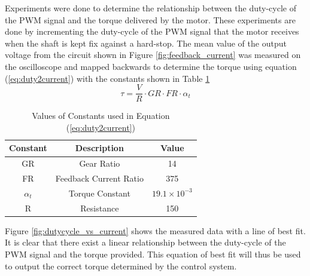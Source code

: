 Experiments were done to determine the relationship between the duty-cycle of the PWM signal and the torque delivered by the motor. These experiments are done by incrementing the duty-cycle of the PWM signal that the motor receives when the shaft is kept fix against a hard-stop. The mean value of the output voltage from the circuit shown in Figure \ref{fig:feedback_current} was measured on the oscilloscope and mapped backwards to determine the torque using equation (\ref{eq:duty2current}) with the constants shown in Table \ref{table:duty2current_constants}
\begin{equation} \label{eq:duty2current}
\tau = \frac{V}{R}\cdot GR \cdot FR \cdot \alpha_{t}
\end{equation}

\begin{table}[]
	\centering
	\begin{tabular}{|c|c|c|}
		\hline
		Constant & Description & Value \\
		\hline
		\hline
		GR &  Gear Ratio & 14 \\
		\hline
		FR & Feedback Current Ratio & 375 \\
		\hline
		$\alpha_{t}$ & Torque Constant & $19.1\times 10^{-3}$ \\
		\hline
		R & Resistance & 150 \\
		\hline
	\end{tabular}
	\caption{Values of Constants used in Equation (\ref{eq:duty2current})}
	\label{table:duty2current_constants}
\end{table}

 Figure \ref{fig:dutycycle_vs_current} shows the measured data with a line of best fit. It is clear that there exist a linear relationship between the duty-cycle of the PWM signal and the torque provided. This equation of best fit will thus be used to output the correct torque determined by the control system.

